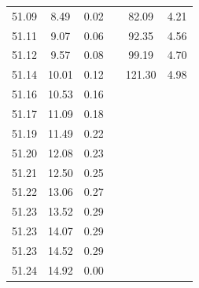 \documentclass[a4paper,12pt]{article}
\begin{document}
\begin{figure}[!h]
{\begin{tabular}{|c|c|c|l|l|l|c|c|}
51.09 & 8.49  & 0.02       & \multicolumn{3}{l|}{}                   & 82.09               & 4.21              \\ \cline{1-3} \cline{7-8} 
51.11 & 9.07  & 0.06       & \multicolumn{3}{l|}{}                   & 92.35               & 4.56              \\ \cline{1-3} \cline{7-8} 
51.12 & 9.57  & 0.08       & \multicolumn{3}{l|}{}                   & 99.19               & 4.70              \\ \cline{1-3} \cline{7-8} 
51.14 & 10.01 & 0.12       & \multicolumn{3}{l|}{}                   & 121.30              & 4.98              \\ \cline{1-3} \cline{7-8} 
51.16 & 10.53 & 0.16       & \multicolumn{3}{l}{}                   & \multicolumn{2}{l}{\multirow{}{}{}}      \\ \cline{1-3}
51.17 & 11.09 & 0.18       & \multicolumn{3}{l}{}                   & \multicolumn{2}{l}{}                   \\ \cline{1-3}
51.19 & 11.49 & 0.22       & \multicolumn{3}{l}{}                   & \multicolumn{2}{l}{}                   \\ \cline{1-3}
51.20 & 12.08 & 0.23       & \multicolumn{3}{l}{}                   & \multicolumn{2}{l}{}                   \\ \cline{1-3}
51.21 & 12.50 & 0.25       & \multicolumn{3}{l}{}                   & \multicolumn{2}{l}{}                   \\ \cline{1-3}
51.22 & 13.06 & 0.27       & \multicolumn{3}{l}{}                   & \multicolumn{2}{l}{}                   \\ \cline{1-3}
51.23 & 13.52 & 0.29       & \multicolumn{3}{l}{}                   & \multicolumn{2}{l}{}                   \\ \cline{1-3}
51.23 & 14.07 & 0.29       & \multicolumn{3}{l}{}                   & \multicolumn{2}{l}{}                   \\ \cline{1-3}
51.23 & 14.52 & 0.29       & \multicolumn{3}{l}{}                   & \multicolumn{2}{l}{}                   \\ \cline{1-3}
51.24 & 14.92 & 0.00       & \multicolumn{3}{l}{}                   & \multicolumn{2}{l}{}                   \\ \cline{1-3}
\end{tabular}
}
\end{figure}
\pagebreak
\end{document}
